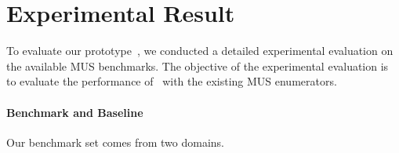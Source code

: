 \section{Experimental Result}
\label{section:experiment}
To evaluate our prototype~\toolname, we conducted a detailed experimental evaluation on the available MUS benchmarks.
The objective of the experimental evaluation is to evaluate the performance of \toolname~with the existing MUS enumerators.

\paragraph{Benchmark and Baseline}
Our benchmark set comes from two domains.


